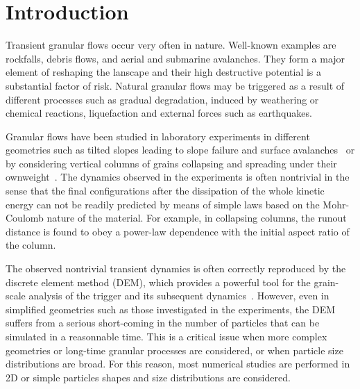 \documentclass[3p,times,procedia,number]{elsarticle}
\begin{document}



\section{Introduction}
\label{sec:intro}
Transient granular flows occur very often in nature. Well-known examples are
rockfalls, debris flows, and aerial and submarine avalanches. They form a major
element of reshaping the lanscape and their high destructive potential is a
substantial factor of risk. Natural granular flows may be triggered as a result
of different processes such as gradual degradation, induced by weathering or
chemical reactions, liquefaction and external forces such as earthquakes.          

Granular flows have been studied in laboratory experiments in different 
geometries such as tilted slopes leading to slope failure and surface
avalanches~\citep{Mutabaruka2015,Legros2002, Iverson1997} or by considering
vertical columns of grains collapsing and spreading under their
ownweight~\citep{Lajeunesse2004, Lajeunesse2005}. The dynamics observed in
the experiments is often nontrivial in the sense that the final configurations
after the dissipation of the whole kinetic energy can not be readily predicted
by means of simple laws based on the Mohr-Coulomb nature of the material. For
example, in collapsing columns, the runout distance is found to obey a
power-law dependence with the initial aspect ratio of the column. 

The observed nontrivial transient dynamics is often correctly reproduced by the
discrete element method (DEM), which provides a powerful tool for the
grain-scale analysis of the trigger and its subsequent
dynamics~\citep{Staron2005, Staron2009}. However, even in simplified geometries
such as those investigated in the experiments, the DEM suffers from a
serious short-coming in the number of particles that can be simulated in a
reasonnable time. This is a critical issue when more complex geometries or
long-time granular processes are considered, or when particle size
distributions are broad. For this reason, most numerical studies are performed
in 2D or simple particles shapes and size distributions are considered. 
\end{document}
